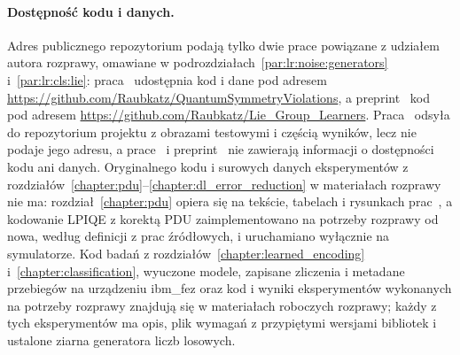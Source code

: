 \paragraph{Dostępność kodu i danych.}
Adres publicznego repozytorium podają tylko dwie prace powiązane z udziałem autora rozprawy, omawiane w podrozdziałach~\ref{par:lr:noise:generators} i~\ref{par:lr:cls:lie}: praca~\cite{raubitzek_quantum_noise} udostępnia kod i dane pod adresem \url{https://github.com/Raubkatz/QuantumSymmetryViolations}, a preprint~\cite{raubitzek_lie_group_manuscript} kod pod adresem \url{https://github.com/Raubkatz/Lie_Group_Learners}.
Praca~\cite{werner_error_reduction_2025} odsyła do repozytorium projektu z obrazami testowymi i częścią wyników, lecz nie podaje jego adresu, a prace~\cite{werner_experiment_driven_2022,werner_magisterka_2022,werner_data_loss_2023} i preprint~\cite{werner_deep_learning_manuscript} nie zawierają informacji o dostępności kodu ani danych.
Oryginalnego kodu i surowych danych eksperymentów z rozdziałów~\ref{chapter:pdu}--\ref{chapter:dl_error_reduction} w materiałach rozprawy nie ma: rozdział~\ref{chapter:pdu} opiera się na tekście, tabelach i rysunkach prac~\cite{werner_experiment_driven_2022,werner_magisterka_2022}, a kodowanie LPIQE z korektą PDU zaimplementowano na potrzeby rozprawy od nowa, według definicji z prac źródłowych, i uruchamiano wyłącznie na symulatorze.
Kod badań z rozdziałów~\ref{chapter:learned_encoding} i~\ref{chapter:classification}, wyuczone modele, zapisane zliczenia i metadane przebiegów na urządzeniu ibm\_fez oraz kod i wyniki eksperymentów wykonanych na potrzeby rozprawy znajdują się w materiałach roboczych rozprawy; każdy z tych eksperymentów ma opis, plik wymagań z przypiętymi wersjami bibliotek i ustalone ziarna generatora liczb losowych.
